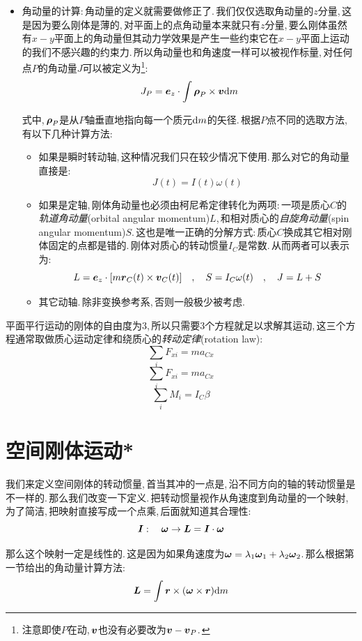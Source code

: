 \begin{itemize}
\item 角动量的计算:\,角动量的定义就需要做修正了.\,我们仅仅选取角动量的$z$分量,\,这是因为要么刚体是薄的,\,对平面上的点角动量本来就只有$z$分量,\,要么刚体虽然有$x-y$平面上的角动量但其动力学效果是产生一些约束它在$x-y$平面上运动的我们不感兴趣的约束力.\,所以角动量也和角速度一样可以被视作标量,\,对任何点$P$的角动量$J$可以被定义为\footnote{注意即使$P$在动,\,$\boldsymbol{v}$也没有必要改为$\boldsymbol{v}-\boldsymbol{v}_P$.\,}:
\[J_P=\boldsymbol{e}_z\cdot \int \boldsymbol{\rho}_P\times \boldsymbol{v}\textrm{d} m\]

式中,\,$\boldsymbol{\rho}_P$是从$P$轴垂直地指向每一个质元$\textrm{d} m$的矢径.\,根据$P$点不同的选取方法,\,有以下几种计算方法:
\begin{itemize}
	\item 如果是瞬时转动轴,\,这种情况我们只在较少情况下使用.\,那么对它的角动量直接是:
	\[J(t)=I(t)\omega(t)\]

	\item 如果是定轴,\,刚体角动量也必须由柯尼希定律转化为两项:\,一项是质心$C$的\emph{轨道角动量}(orbital angular momentum)$L$,\,和相对质心的\emph{自旋角动量}(spin angular momentum)$S$.\,这也是唯一正确的分解方式:\,质心$C$换成其它相对刚体固定的点都是错的.\,刚体对质心的转动惯量$I_C$是常数.\,从而两者可以表示为:
	\[L=\boldsymbol{e}_z\cdot [m\boldsymbol{r}_C(t)\times \boldsymbol{v}_C(t)]\quad,\quad S=I_C\omega(t)\quad,\quad J=L+S\]
	
	\item 其它动轴.\,除非变换参考系,\,否则一般极少被考虑.
\end{itemize}
\end{itemize}

平面平行运动的刚体的自由度为3,\,所以只需要3个方程就足以求解其运动,\,这三个方程通常取做质心运动定律和绕质心的\emph{转动定律}(rotation law):
\[\sum_i F_{xi}=m a_{Cx}\]
\[\sum_i F_{xi}=m a_{Cx}\]
\[\sum_i M_{i}=I_{C} \beta\]

\section{空间刚体运动*}\label{6.3}

我们来定义空间刚体的转动惯量,\,首当其冲的一点是,\,沿不同方向的轴的转动惯量是不一样的.\,那么我们改变一下定义.\,把转动惯量视作从角速度到角动量的一个映射,\,为了简洁,\,把映射直接写成一个点乘,\,后面就知道其合理性:
\[\boldsymbol{I}:\quad \boldsymbol{\omega}\to \boldsymbol{L}=\boldsymbol{I}\cdot\boldsymbol{\omega}\]

那么这个映射一定是线性的.\,这是因为如果角速度为$\boldsymbol{\omega}=\lambda_1\boldsymbol{\omega}_1+\lambda_2\boldsymbol{\omega}_2$.\,那么根据第一节给出的角动量计算方法:
\[\boldsymbol{L}=\int \boldsymbol{r}\times(\boldsymbol{\omega}\times \boldsymbol{r})\textrm{d} m\]

